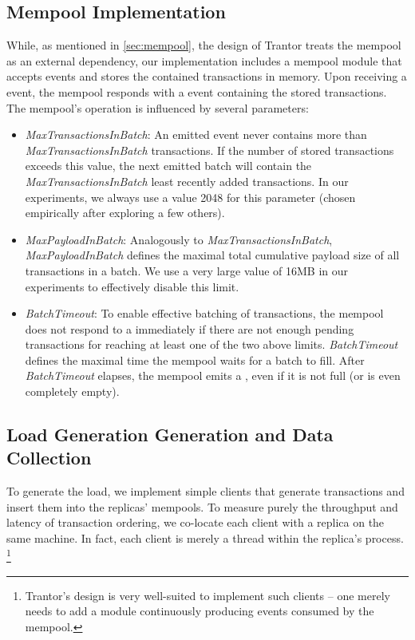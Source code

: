 \documentclass{article}
\begin{document}
\subsection{Mempool Implementation}

While, as mentioned in \cref{sec:mempool}, the design of Trantor treats the mempool as an external dependency,
our implementation includes a mempool module that accepts  events and stores the contained transactions in memory.
Upon receiving a  event, the mempool responds with a  event containing the stored transactions.
The mempool's operation is influenced by several parameters:

\begin{itemize}
    
    \item \textit{MaxTransactionsInBatch}: An emitted  event never contains more than \textit{MaxTransactionsInBatch} transactions.
    If the number of stored transactions exceeds this value, the next emitted batch will contain the \textit{MaxTransactionsInBatch} least recently added transactions.
    In our experiments, we always use a value 2048 for this parameter (chosen empirically after exploring a few others).
    
    \item \textit{MaxPayloadInBatch}: Analogously to \textit{MaxTransactionsInBatch},
    \textit{MaxPayloadInBatch} defines the maximal total cumulative payload size of all transactions in a batch.
    We use a very large value of 16MB in our experiments to effectively disable this limit.
    
    \item \textit{BatchTimeout}: To enable effective batching of transactions, the mempool does not respond to a  immediately
    if there are not enough pending transactions for reaching at least one of the two above limits.
    \textit{BatchTimeout} defines the maximal time the mempool waits for a batch to fill.
    After \textit{BatchTimeout} elapses, the mempool emits a , even if it is not full (or is even completely empty).
\end{itemize}

\subsection{Load Generation Generation and Data Collection}

To generate the load, we implement simple clients that generate transactions and insert them into the replicas' mempools.
To measure purely the throughput and latency of transaction ordering, we co-locate each client with a replica on the same machine.
In fact, each client is merely a thread within the replica's process.%
\footnote{Trantor's design is very well-suited to implement such clients --
one merely needs to add a module continuously producing  events consumed by the mempool.}
\end{document}
